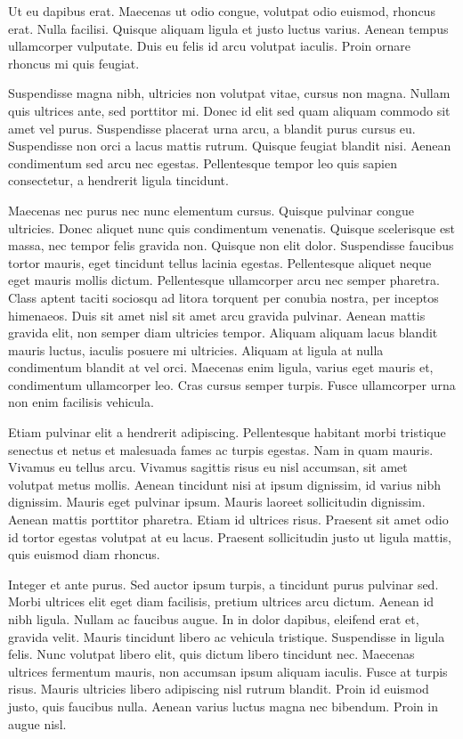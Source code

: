\documentclass[9pt]{memoir}
\begin{document}
Ut eu dapibus erat. Maecenas ut odio congue, volutpat odio euismod, rhoncus erat. Nulla facilisi. Quisque aliquam ligula et justo luctus varius. Aenean tempus ullamcorper vulputate. Duis eu felis id arcu volutpat iaculis. Proin ornare rhoncus mi quis feugiat.

Suspendisse magna nibh, ultricies non volutpat vitae, cursus non magna. Nullam quis ultrices ante, sed porttitor mi. Donec id elit sed quam aliquam commodo sit amet vel purus. Suspendisse placerat urna arcu, a blandit purus cursus eu. Suspendisse non orci a lacus mattis rutrum. Quisque feugiat blandit nisi. Aenean condimentum sed arcu nec egestas. Pellentesque tempor leo quis sapien consectetur, a hendrerit ligula tincidunt.

Maecenas nec purus nec nunc elementum cursus. Quisque pulvinar congue ultricies. Donec aliquet nunc quis condimentum venenatis. Quisque scelerisque est massa, nec tempor felis gravida non. Quisque non elit dolor. Suspendisse faucibus tortor mauris, eget tincidunt tellus lacinia egestas. Pellentesque aliquet neque eget mauris mollis dictum. Pellentesque ullamcorper arcu nec semper pharetra. Class aptent taciti sociosqu ad litora torquent per conubia nostra, per inceptos himenaeos. Duis sit amet nisl sit amet arcu gravida pulvinar. Aenean mattis gravida elit, non semper diam ultricies tempor. Aliquam aliquam lacus blandit mauris luctus, iaculis posuere mi ultricies. Aliquam at ligula at nulla condimentum blandit at vel orci. Maecenas enim ligula, varius eget mauris et, condimentum ullamcorper leo. Cras cursus semper turpis. Fusce ullamcorper urna non enim facilisis vehicula.

Etiam pulvinar elit a hendrerit adipiscing. Pellentesque habitant morbi tristique senectus et netus et malesuada fames ac turpis egestas. Nam in quam mauris. Vivamus eu tellus arcu. Vivamus sagittis risus eu nisl accumsan, sit amet volutpat metus mollis. Aenean tincidunt nisi at ipsum dignissim, id varius nibh dignissim. Mauris eget pulvinar ipsum. Mauris laoreet sollicitudin dignissim. Aenean mattis porttitor pharetra. Etiam id ultrices risus. Praesent sit amet odio id tortor egestas volutpat at eu lacus. Praesent sollicitudin justo ut ligula mattis, quis euismod diam rhoncus.

Integer et ante purus. Sed auctor ipsum turpis, a tincidunt purus pulvinar sed. Morbi ultrices elit eget diam facilisis, pretium ultrices arcu dictum. Aenean id nibh ligula. Nullam ac faucibus augue. In in dolor dapibus, eleifend erat et, gravida velit. Mauris tincidunt libero ac vehicula tristique. Suspendisse in ligula felis. Nunc volutpat libero elit, quis dictum libero tincidunt nec. Maecenas ultrices fermentum mauris, non accumsan ipsum aliquam iaculis. Fusce at turpis risus. Mauris ultricies libero adipiscing nisl rutrum blandit. Proin id euismod justo, quis faucibus nulla. Aenean varius luctus magna nec bibendum. Proin in augue nisl.
\end{document}
